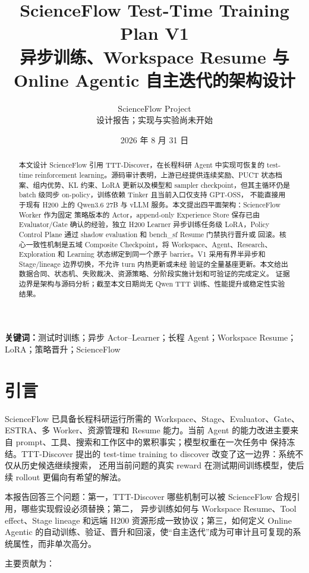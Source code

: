 \documentclass[UTF8,11pt,a4paper]{ctexart}
\title{\vspace{-1.2em}\bfseries
ScienceFlow Test-Time Training Plan V1\\[0.25em]
\large 异步训练、Workspace Resume 与 Online Agentic 自主迭代的架构设计}
\author{ScienceFlow Project\\[-0.1em]\small 设计报告；实现与实验尚未开始}
\date{2026 年 8 月 31 日}
\begin{document}
\maketitle

\begin{abstract}
本文设计 ScienceFlow 引用 TTT-Discover，在长程科研 Agent 中实现可恢复的 test-time reinforcement
learning。源码审计表明，上游已经提供连续奖励、PUCT 状态档案、组内优势、KL 约束、LoRA 更新以及模型和
sampler checkpoint，但其主循环仍是 batch 级同步 on-policy，训练依赖 Tinker 且当前入口仅支持 GPT-OSS，
不能直接用于现有 H200 上的 Qwen3.6 27B 与 vLLM 服务。本文提出四平面架构：ScienceFlow Worker 作为固定
策略版本的 Actor，append-only Experience Store 保存已由 Evaluator/Gate 确认的经验，独立 H200 Learner
异步训练任务级 LoRA，Policy Control Plane 通过 shadow evaluation 和 bench\_sf Resume 门禁执行晋升或
回滚。核心一致性机制是五域 Composite Checkpoint，将 Workspace、Agent、Research、Exploration 和 Learning
状态绑定到同一个原子 barrier。V1 采用有界半异步和 Stage/lineage 边界切换，不允许 turn 内热更新或未经
验证的全量基座更新。本文给出数据合同、状态机、失败裁决、资源策略、分阶段实施计划和可验证的完成定义。
证据边界是架构与源码分析；截至本文日期尚无 Qwen TTT 训练、性能提升或稳定性实验结果。
\end{abstract}

\noindent\textbf{关键词：}测试时训练；异步 Actor--Learner；长程 Agent；Workspace Resume；LoRA；策略晋升；ScienceFlow

\section{引言}

ScienceFlow 已具备长程科研运行所需的 Workspace、Stage、Evaluator、Gate、ESTRA、多 Worker、资源管理和
Resume 能力。当前 Agent 的能力改进主要来自 prompt、工具、搜索和工作区中的累积事实；模型权重在一次任务中
保持冻结。TTT-Discover 提出的 test-time training to discover 改变了这一边界：系统不仅从历史候选继续搜索，
还用当前问题的真实 reward 在测试期间训练模型，使后续 rollout 更偏向有希望的解法\cite{ttt-paper,ttt-repo}。

本报告回答三个问题：第一，TTT-Discover 哪些机制可以被 ScienceFlow 合规引用，哪些实现假设必须替换；第二，
异步训练如何与 Workspace Resume、Tool effect、Stage lineage 和远端 H200 资源形成一致协议；第三，如何定义
Online Agentic 的自动训练、验证、晋升和回滚，使“自主迭代”成为可审计且可复现的系统属性，而非单次高分。

主要贡献为：
\end{document}
